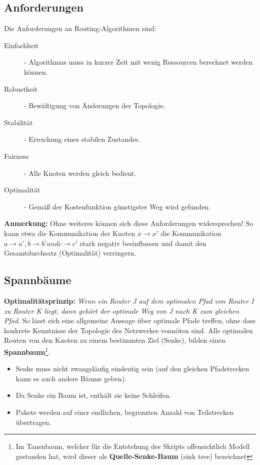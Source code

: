 \documentclass{article} %
\begin{document}
\subsection{Anforderungen}
Die Anforderungen an Routing-Algorithmen sind:
\begin{description}
	\item[Einfachheit] - Algorithmus muss in kurzer Zeit mit wenig Ressourcen berechnet werden können.
	\item[Robustheit] - Bewältigung von Änderungen der Topologie.
	\item[Stabilität] - Erreichung eines stabilen Zustandes.
	\item[Fairness] - Alle Knoten werden gleich bedient.
	\item[Optimalität] - Gemäß der Kostenfunktion günstigster Weg wird gefunden.
\end{description}
\textbf{Anmerkung:} Ohne weiteres können sich diese Anforderungen widersprechen!
So kann etwa die Kommunikation der Knoten $x \rightarrow x'$ die Kommunikation $a \rightarrow a', b \rightarrow b' und c \rightarrow c'$ stark negativ beeinflussen und damit den Gesamtdurchsatz (Optimalität) verringern.

\subsection{Spannbäume}
\textbf{Optimalitätsprinzip:} \emph{Wenn ein Router J auf dem optimalen Pfad von Router I zu Router K liegt, dann gehört der optimale Weg von J nach K zum gleichen Pfad}\cite{tanenbaum2003computer}.
So lässt sich eine allgemeine Aussage über optimale Pfade treffen, ohne dass konkrete Kenntnisse der Topologie des Netzwerkes vonnöten sind.
Alle optimalen Routen von den Knoten zu einem bestimmten Ziel (Senke), bilden einen \textbf{Spannbaum}\footnote{Im Tanenbaum\cite{tanenbaum2003computer}, welcher für die Entstehung des Skripts offensichtlich Modell gestanden hat, wird dieser als \textbf{Quelle-Senke-Baum} (sink tree) bezeichnet}.
\begin{itemize}
	\item Senke muss nicht zwangsläufig eindeutig sein (auf den
	gleichen Pfadstrecken kann es auch andere Bäume geben).
	\item Da Senke ein Baum ist, enthält sie keine Schleifen.
	\item Pakete werden auf einer endlichen, begrenzten Anzahl von
	Teilstrecken übertragen.
\end{itemize}
\end{document}
